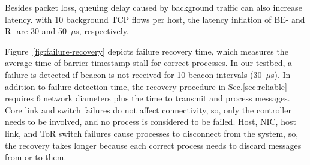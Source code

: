 Besides packet loss, queuing delay caused by background traffic can also increase \sys{} latency.  with 10 background TCP flows per host, the latency inflation of BE-\sys{} and R-\sys{} are 30 and 50~$\mu$s, respectively.





Figure~\ref{fig:failure-recovery} depicts failure recovery time, which measures the average time of barrier timestamp stall for correct processes.
In our testbed, a failure is detected if beacon is not received for 10 beacon intervals (30~$\mu$s).
In addition to failure detection time, the recovery procedure in Sec.\ref{sec:reliable} requires 6 network diameters plus the time to transmit and process messages.
Core link and switch failures do not affect connectivity, so, only the controller needs to be involved, and no process is considered to be failed.
Host, NIC, host link, and ToR switch failures cause processes to disconnect from the system, so, the recovery takes longer because each correct process needs to discard messages from or to them.


